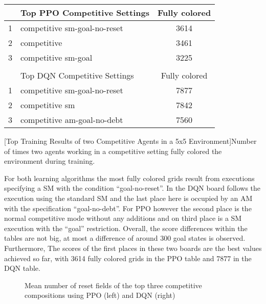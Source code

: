\begin{center}
    \begin{tabular}{clc}\hline
         & Top PPO Competitive Settings & Fully colored \\ \hline
        {\small 1} & competitive sm-goal-no-reset & 3614 \\
        {\small 2} & competitive & 3461 \\
        {\small 3} & competitive sm-goal & 3225 \\ \hline
         &   \\ \hline
         & Top DQN Competitive Settings & Fully colored \\ \hline
        {\small 1} & competitive sm-goal-no-reset & 7877 \\
        {\small 2} & competitive sm & 7842 \\
        {\small 3} & competitive am-goal-no-debt & 7560 \\ \hline
        \end{tabular}
        [Top Training Results of two Competitive Agents in a 5x5 Environment]{Number of times two agents working in a competitive setting fully colored the environment during training.}\label{t:2-comp-easy}
    \end{center}

For both learning algorithms the most fully colored grids result from executions specifying a SM with the condition ``goal-no-reset''. In the DQN board follows the execution using the standard SM and the last place here is occupied by an AM with the specification ``goal-no-debt''. For PPO however the second place is the normal competitive mode without any additions and on third place is a SM execution with the ``goal'' restriction. Overall, the score differences within the tables are not big, at most a difference of around 300 goal states is observed. Furthermore, The scores of the first places in these two boards are the best values achieved so far, with 3614 fully colored grids in the PPO table and 7877 in the DQN table.

\begin{figure}[hpbt]
    \centering
    \hspace{0.01\textwidth}
    \caption[Mean Number of Reset Fields of the Top Competitive Modes in a 5x5 Environment]{Mean number of reset fields of the top three competitive compositions using PPO (left) and DQN (right)}
    \label{fig:multipic_plots_comp_easy} %
\end{figure}

